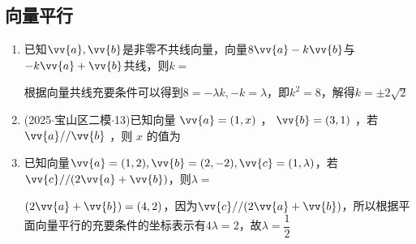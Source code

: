 \subsection*{向量平行}
\begin{enumerate}
    \item 已知$\vv{a}, \vv{b}$是非零不共线向量，向量$8\vv{a} - k \vv{b}$与$-k\vv{a} + \vv{b}$共线，则$k = $ 
        \begin{jieda}
            根据向量共线充要条件可以得到$8 = -\lambda k, -k = \lambda$，即$k^2 = 8$，解得$k = \pm 2\sqrt{2}$
        \end{jieda}
    \item (2025$\cdot$宝山区二模$\cdot$13)已知向量 $\vv{a} = \left( {1,x}\right)$ ， $\vv{b} = \left( {3,1}\right)$ ，若 $\vv{a}//\vv{b}$ ，则 $x$ 的值为 

    \item 已知向量$\vv{a} = (1, 2), \vv{b} = (2, -2), \vv{c} = (1, \lambda)$，若$\vv{c} // (2\vv{a} + \vv{b})$，则$\lambda = $
    \begin{jieda}
        $(2\vv{a} + \vv{b}) = (4, 2)$，因为$\vv{c} // (2\vv{a} + \vv{b})$，所以根据平面向量平行的充要条件的坐标表示有$4\lambda = 2$，故$\lambda = \dfrac{1}{2}$
    \end{jieda}
\end{enumerate}

